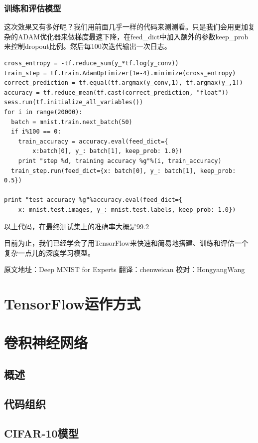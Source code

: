 \documentclass[a4paper,11pt,twoside]{ctexbook}
\begin{document}
\subsubsection{训练和评估模型}

这次效果又有多好呢？我们用前面几乎一样的代码来测测看。只是我们会用更加复杂的ADAM优化器来做梯度最速下降，在feed\_dict中加入额外的参数keep\_prob来控制dropout比例。然后每100次迭代输出一次日志。

\begin{lstlisting}
cross_entropy = -tf.reduce_sum(y_*tf.log(y_conv))
train_step = tf.train.AdamOptimizer(1e-4).minimize(cross_entropy)
correct_prediction = tf.equal(tf.argmax(y_conv,1), tf.argmax(y_,1))
accuracy = tf.reduce_mean(tf.cast(correct_prediction, "float"))
sess.run(tf.initialize_all_variables())
for i in range(20000):
  batch = mnist.train.next_batch(50)
  if i%100 == 0:
    train_accuracy = accuracy.eval(feed_dict={
        x:batch[0], y_: batch[1], keep_prob: 1.0})
    print "step %d, training accuracy %g"%(i, train_accuracy)
  train_step.run(feed_dict={x: batch[0], y_: batch[1], keep_prob: 0.5})

print "test accuracy %g"%accuracy.eval(feed_dict={
    x: mnist.test.images, y_: mnist.test.labels, keep_prob: 1.0})
\end{lstlisting}

以上代码，在最终测试集上的准确率大概是99.2%

目前为止，我们已经学会了用TensorFlow来快速和简易地搭建、训练和评估一个复杂一点儿的深度学习模型。

原文地址：Deep MNIST for Experts
翻译：chenweican
校对：HongyangWang

\newpage
\section {TensorFlow运作方式}
\section {卷积神经网络}
\subsection {概述}
\subsection {代码组织}
\subsection {CIFAR-10模型}
\end{document}
